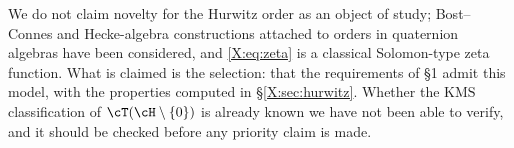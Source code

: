 We do not claim novelty for the Hurwitz order as an object of study; Bost--Connes and
Hecke-algebra constructions attached to orders in quaternion algebras have been considered,
and \eqref{X:eq:zeta} is a classical Solomon-type zeta function. What is claimed is the
selection: that the requirements of \S1 admit this model, with the properties computed in
\S\ref{X:sec:hurwitz}. Whether the $\mathrm{KMS}$ classification of $\cT(\cH\setminus\{0\})$ is
already known we have not been able to verify, and it should be checked before any priority
claim is made.

